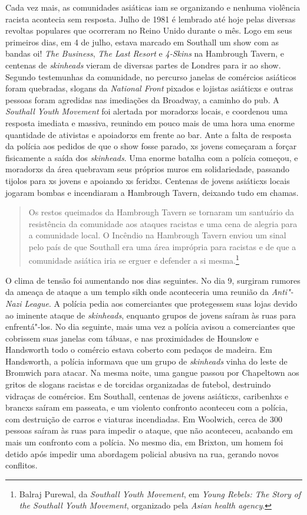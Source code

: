 Cada vez mais, as comunidades asiáticas iam se organizando e nenhuma violência racista acontecia sem resposta. Julho de 1981 é lembrado até hoje pelas diversas revoltas populares que ocorreram no Reino Unido durante o mês. Logo em seus primeiros dias, em 4 de julho, estava marcado em Southall um show com as bandas oi! \emph{The Business}, \emph{The Last Resort} e \emph{4-Skins} na Hambrough Tavern, e centenas de \emph{skinheads} vieram de diversas partes de Londres para ir ao show. Segundo testemunhas da comunidade, no percurso janelas de comércios asiáticos foram quebradas, slogans da \emph{National Front} pixados e lojistas asiáticxs e outras pessoas foram agredidas nas imediações da Broadway, a caminho do pub. A \emph{Southall Youth Movement} foi alertada por moradorxs locais, e coordenou uma resposta imediata e massiva, reunindo em pouco mais de uma hora uma enorme quantidade de ativistas e apoiadorxs em frente ao bar. Ante a falta de resposta da polícia aos pedidos de que o show fosse parado, xs jovens começaram a forçar fisicamente a saída dos \emph{skinheads}. Uma enorme batalha com a polícia começou, e moradorxs da área quebravam seus próprios muros em solidariedade, passando tijolos para xs jovens e apoiando xs feridxs. Centenas de jovens asiáticxs locais jogaram bombas e incendiaram a Hambrough Tavern, deixando tudo em chamas.

\begin{quote}
Os restos queimados da Hambrough Tavern se tornaram um santuário da resistência da comunidade aos ataques racistas e uma cena de alegria para a comunidade local. O Incêndio na Hambrough Tavern enviou um sinal pelo país de que Southall era uma área imprópria para racistas e de que a comunidade asiática iria se erguer e defender a si mesma.\footnote{Balraj Purewal, da \emph{Southall Youth Movement}, em \emph{Young Rebels: The Story of the Southall Youth Movement}, organizado pela \emph{Asian health agency}.}
\end{quote}

O clima de tensão foi aumentando nos dias seguintes. No dia 9, surgiram rumores da ameaça de ataque a um templo sikh onde aconteceria uma reunião da \emph{Anti"-Nazi League}. A polícia pedia aos comerciantes que protegessem suas lojas devido ao iminente ataque de \emph{skinheads}, enquanto grupos de jovens saíram às ruas para enfrentá"-los. No dia seguinte, mais uma vez a polícia avisou a comerciantes que cobrissem suas janelas com tábuas, e nas proximidades de Hounslow e Handsworth todo o comércio estava coberto com pedaços de madeira. Em Handsworth, a polícia informava que um grupo de \emph{skinheads} vinha do leste de Bromwich para atacar. Na mesma noite, uma gangue passou por Chapeltown aos gritos de slogans racistas e de torcidas organizadas de futebol, destruindo vidraças de comércios. Em Southall, centenas de jovens asiáticxs, caribenhxs e brancxs saíram em passeata, e um violento confronto aconteceu com a polícia, com destruição de carros e viaturas incendiadas. Em Woolwich, cerca de 300 pessoas saíram às ruas para impedir o ataque, que não aconteceu, acabando em mais um confronto com a polícia. No mesmo dia, em Brixton, um homem foi detido após impedir uma abordagem policial abusiva na rua, gerando novos conflitos.

